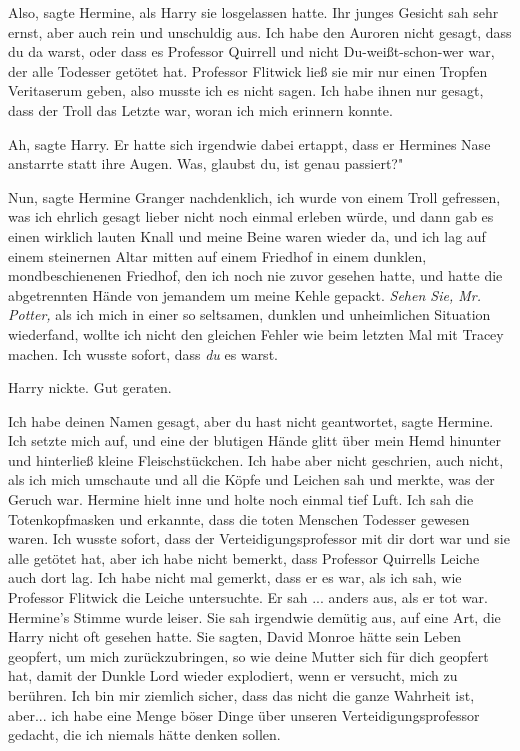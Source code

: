 \glqq{}Also\grqq{}, sagte Hermine, als Harry sie losgelassen hatte. Ihr junges
Gesicht sah sehr ernst, aber auch rein und unschuldig aus. \glqq{}Ich habe den
Auroren nicht gesagt, dass du da warst, oder dass es Professor Quirrell und
nicht Du-weißt-schon-wer war, der alle Todesser getötet hat. Professor Flitwick
ließ sie mir nur einen Tropfen Veritaserum geben, also musste ich es nicht
sagen. Ich habe ihnen nur gesagt, dass der Troll das Letzte war, woran ich mich
erinnern konnte.\grqq{}

\glqq{}Ah\grqq{}, sagte Harry. Er hatte sich irgendwie dabei ertappt, dass er
Hermines Nase anstarrte statt ihre Augen. \glqq{}Was, glaubst du, ist genau
passiert?"

\glqq{}Nun\grqq{}, sagte Hermine Granger nachdenklich, \glqq{}ich wurde von einem
Troll gefressen, was ich ehrlich gesagt lieber nicht noch einmal erleben würde,
und dann gab es einen wirklich lauten Knall und meine Beine waren wieder da, und
ich lag auf einem steinernen Altar mitten auf einem Friedhof in einem dunklen,
mondbeschienenen Friedhof, den ich noch nie zuvor gesehen hatte, und hatte die
abgetrennten Hände von jemandem um meine Kehle gepackt. \emph{Sehen Sie, Mr.
Potter,} als ich mich in einer so seltsamen, dunklen und unheimlichen Situation
wiederfand, wollte ich nicht den gleichen Fehler wie beim letzten Mal mit Tracey
machen. Ich wusste sofort, dass \emph{du} es warst.\grqq{}

Harry nickte. \glqq{}Gut geraten.\grqq{}

\glqq{}Ich habe deinen Namen gesagt, aber du hast nicht geantwortet\grqq{}, sagte
Hermine. \glqq{}Ich setzte mich auf, und eine der blutigen Hände glitt über mein
Hemd hinunter und hinterließ kleine Fleischstückchen. Ich habe aber nicht
geschrien, auch nicht, als ich mich umschaute und all die Köpfe und Leichen sah
und merkte, was der Geruch war.\grqq{} Hermine hielt inne und holte noch einmal
tief Luft. \glqq{}Ich sah die Totenkopfmasken und erkannte, dass die toten
Menschen Todesser gewesen waren. Ich wusste sofort, dass der
Verteidigungsprofessor mit dir dort war und sie alle getötet hat, aber ich habe
nicht bemerkt, dass Professor Quirrells Leiche auch dort lag. Ich habe nicht mal
gemerkt, dass er es war, als ich sah, wie Professor Flitwick die Leiche
untersuchte. Er sah ... anders aus, als er tot war.\grqq{} Hermine's Stimme
wurde leiser. Sie sah irgendwie demütig aus, auf eine Art, die Harry nicht oft
gesehen hatte. \glqq{}Sie sagten, David Monroe hätte sein Leben geopfert, um mich
zurückzubringen, so wie deine Mutter sich für dich geopfert hat, damit der
Dunkle Lord wieder explodiert, wenn er versucht, mich zu berühren. Ich bin mir
ziemlich sicher, dass das nicht die ganze Wahrheit ist, aber... ich habe eine
Menge böser Dinge über unseren Verteidigungsprofessor gedacht, die ich niemals
hätte denken sollen.\grqq{}

